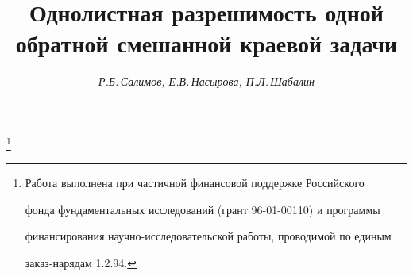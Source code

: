 








\newcommand{\const}{\operatorname{const}}


\newcommand{\dist}{\operatorname{dist}}


\newcommand{\re}{\operatorname{Re}}


\newcommand{\im}{\operatorname{Im}}


\newcommand{\tts}[1]{}







 


\setcounter{page}{78}












\author{\it Р.Б.\,Салимов, Е.В.\,Насырова, П.Л.\,Шабалин}




\title{Однолистная разрешимость одной\\


обратной смешанной краевой задачи}





\thanks{Работа выполнена при частичной финансовой поддержке Российского


фонда фундаментальных исследований (грант 96-01-00110) и программы


финансирования научно-исследовательской работы, проводимой по единым


заказ-нарядам 1.2.94.}


